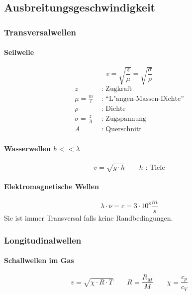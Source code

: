 \subsection{Ausbreitungsgeschwindigkeit}

\subsubsection{Transversalwellen}

\paragraph{Seilwelle}
\begin{equation}
	v = \sqrt{\frac{z}{\mu}} = \sqrt{\frac{\sigma}{\rho}}
\end{equation}
\begin{align*}
	z &\text{ : Zugkraft} \\
	\mu=\frac{m}{l} &\text{ : ``L"angen-Massen-Dichte''} \\
	\rho &\text{ : Dichte} \\
	\sigma=\frac{z}{A} &\text{ : Zugspannung} \\
	A &\text{ : Querschnitt}
\end{align*}

\paragraph{Wasserwellen $h<<\lambda$}
\begin{equation}
	v=\sqrt{g\cdot h}\qquad h\text{ : Tiefe}
\end{equation}

\paragraph{Elektromagnetische Wellen}
\begin{equation}
	\lambda\cdot\nu=c=3\cdot 10^8\unit{\frac{m}{s}}
\end{equation}
\noindent Sie ist immer Transversal falls keine Randbedingungen.

\subsubsection{Longitudinalwellen}

\paragraph{Schallwellen im Gas}
\begin{equation}
	v=\sqrt{\chi\cdot R\cdot T}\qquad R=\frac{R_M}{M}\qquad \chi=\frac{c_p}{c_V}
\end{equation}

